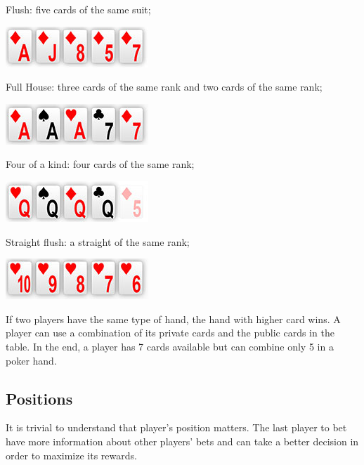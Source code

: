 Flush: five cards of the same suit;

\begin{center}
\includegraphics[scale=2]{flush}
\end{center}

Full House: three cards of the same rank and two cards of the same rank;

\begin{center}
\includegraphics[scale=2]{full-house}
\end{center}

Four of a kind: four cards of the same rank;

\begin{center}
\includegraphics[scale=2]{four-of-a-kind}
\end{center}

Straight flush: a straight of the same rank;

\begin{center}
\includegraphics[scale=2]{straight-flush}
\end{center}

If two players have the same type of hand, the hand with higher card wins. A player can use a combination of its private cards and the public cards in the table. In the end, a player has 7 cards available but can combine only 5 in a poker hand.

\subsection{Positions}
\label{sec:positions}

It is trivial to understand that player's position matters. The last player to bet have more information about other players' bets and can take a better decision in order to maximize its rewards.

